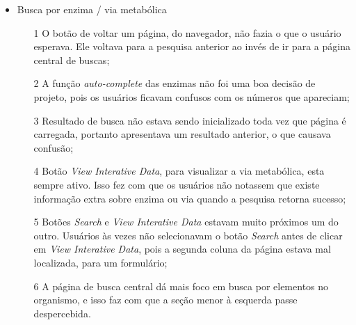 \begin{itemize}
\item Busca por enzima / via metabólica
  \begin{itemize}
  \item[1] O botão de voltar um página, do navegador, não fazia o que o usuário esperava. Ele voltava para a pesquisa anterior ao invés de ir para a página central de buscas;
  \item[2] A função \textit{auto-complete} das enzimas não foi uma boa decisão de projeto, pois os usuários ficavam confusos com os números que apareciam;
  \item[3] Resultado de busca não estava sendo inicializado toda vez que página é carregada, portanto apresentava um resultado anterior, o que causava confusão;
  \item[4] Botão \textit{View Interative Data}, para visualizar a via metabólica, esta sempre ativo. Isso fez com que os usuários não notassem que existe informação extra sobre enzima ou via quando a pesquisa retorna sucesso;
  \item[5] Botões \textit{Search} e \textit{View Interative Data} estavam muito próximos um do outro. Usuários às vezes não selecionavam o botão \textit{Search} antes de clicar em \textit{View Interative Data}, pois a segunda coluna da página estava mal localizada, para um formulário;
  \item[6] A página de busca central dá mais foco em busca por elementos no organismo, e isso faz com que a seção menor à esquerda passe despercebida.
  \end{itemize}


\end{itemize}
